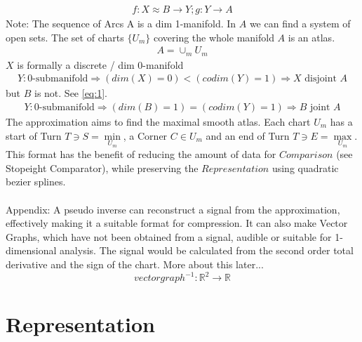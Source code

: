 \documentclass{report}
\begin{document}
\begin{align}
f: X \approx B \rightarrow Y; g: Y \rightarrow A
\end{align}
Note: The sequence of Arcs A is a dim 1-manifold. In $A$ we can find a system of open sets. The set of charts $\{U_{m}\}$ covering the whole manifold $A$ is an atlas. ~\cite[3.1.1.]{Fomenko} ~\cite[4.5]{Wall}
\begin{align}
A = \cup_{m}U_{m}
\end{align}
$X$ is formally a discrete / dim 0-manifold
\begin{align}
Y: \text{0-submanifold} \Rightarrow (dim(X)=0)<(codim(Y)=1) \Rightarrow X \text{ disjoint } A
\end{align}
but $B$ is not. See \eqref{eq:1}.
\begin{align}
Y: \text{0-submanifold} \Rightarrow (dim(B)=1)=(codim(Y)=1) \Rightarrow B \text{ joint } A
\end{align}
The approximation aims to find the maximal smooth atlas. Each chart $U_{m}$ has a start of Turn $T \ni S = \min \limits _{U_{m}}$, a Corner $C \in U_{m}$ and an end of Turn $T \ni E = \max \limits _{U_{m}}$. This format has the benefit of reducing the amount of data for $Comparison$ (see Stopeight Comparator), while preserving the $Representation$ using quadratic bezier splines.\\\\
Appendix: A pseudo inverse can reconstruct a signal from the approximation, effectively making it a suitable format for compression. It can also make Vector Graphs, which have not been obtained from a signal, audible or suitable for 1-dimensional analysis. The signal would be calculated from the second order total derivative and the sign of the chart. More about this later...
\begin{equation}
vectorgraph^{-1}: \mathbb{R}^2 \rightarrow \mathbb{R}
\end{equation}

\chapter{Representation}
\end{document}
